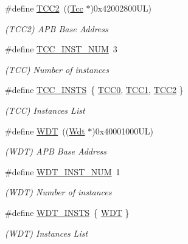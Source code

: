 \begin{DoxyCompactItemize}
\#define \mbox{\hyperlink{group___s_a_m_d21_g15_l__base_ga121a04059fe14ada844fa8b342359d6e}{T\+C\+C2}}~((\mbox{\hyperlink{struct_tcc}{Tcc}}      $\ast$)0x42002800\+U\+L)
\begin{DoxyCompactList}\small\item\em (T\+C\+C2) A\+PB Base Address \end{DoxyCompactList}\item 
\#define \mbox{\hyperlink{group___s_a_m_d21_g15_l__base_ga592c28355fa7a9529ac689a33d039fb1}{T\+C\+C\+\_\+\+I\+N\+S\+T\+\_\+\+N\+UM}}~3
\begin{DoxyCompactList}\small\item\em (T\+CC) Number of instances \end{DoxyCompactList}\item 
\#define \mbox{\hyperlink{group___s_a_m_d21_g15_l__base_ga2c3bec33cd9ed028f65c14d67c6c5326}{T\+C\+C\+\_\+\+I\+N\+S\+TS}}~\{ \mbox{\hyperlink{group___s_a_m_d21_j18_a__base_ga99138b66570ac6a4b370ce5c3b52cd9f}{T\+C\+C0}}, \mbox{\hyperlink{group___s_a_m_d21_j18_a__base_gadd92e1743edad42328471d8ed6d00a6d}{T\+C\+C1}}, \mbox{\hyperlink{group___s_a_m_d21_j18_a__base_ga121a04059fe14ada844fa8b342359d6e}{T\+C\+C2}} \}
\begin{DoxyCompactList}\small\item\em (T\+CC) Instances List \end{DoxyCompactList}\item 
\#define \mbox{\hyperlink{group___s_a_m_d21_g15_l__base_ga9646f603341e1ee220bf5d9948f05cb0}{W\+DT}}~((\mbox{\hyperlink{struct_wdt}{Wdt}}      $\ast$)0x40001000\+U\+L)
\begin{DoxyCompactList}\small\item\em (W\+DT) A\+PB Base Address \end{DoxyCompactList}\item 
\#define \mbox{\hyperlink{group___s_a_m_d21_g15_l__base_gafac1297a6a4da34e5ff29b61dfb5552e}{W\+D\+T\+\_\+\+I\+N\+S\+T\+\_\+\+N\+UM}}~1
\begin{DoxyCompactList}\small\item\em (W\+DT) Number of instances \end{DoxyCompactList}\item 
\#define \mbox{\hyperlink{group___s_a_m_d21_g15_l__base_gacde2ac91a26c9c096b18f47009b48b81}{W\+D\+T\+\_\+\+I\+N\+S\+TS}}~\{ \mbox{\hyperlink{group___s_a_m_d21_j18_a__base_ga9646f603341e1ee220bf5d9948f05cb0}{W\+DT}} \}
\begin{DoxyCompactList}\small\item\em (W\+DT) Instances List \end{DoxyCompactList}\end{DoxyCompactItemize}


